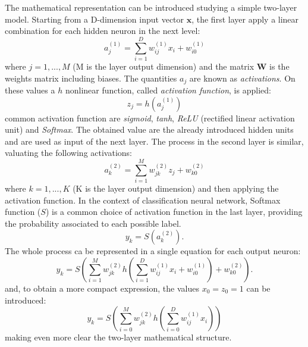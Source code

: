 The mathematical representation can be introduced studying a simple two-layer model. Starting from a D-dimension input vector $\bm{x}$, the first layer apply a linear combination for each hidden neuron in the next level:
\begin{equation}
    a_j^{(1)} = \sum_{i=1}^D w_{ij}^{(1)} x_i + w_{i0}^{(1)}
\end{equation}
where $j = 1,..., M$ (M is the layer output dimension) and the matrix $\bm{W}$ is the weights matrix including biases. The quantities $a_j$ are known as \textit{activations}. On these values a $h$ nonlinear function, called \textit{activation function}, is applied:
\begin{equation}
    z_j = h(a_j^{(1)})
\end{equation}
common activation function are \textit{sigmoid}, \textit{tanh}, \textit{ReLU} (rectified linear activation unit) and \textit{Softmax}. The obtained value are the already introduced hidden units and are used as input of the next layer. The process in the second layer is similar, valuating the following activations:
\begin{equation}
    a_k^{(2)} = \sum_{i=1}^M w_{jk}^{(2)} z_j + w_{k0}^{(2)}
\end{equation}
where $k = 1,..., K$ (K is the layer output dimension) and then applying the activation function. In the context of classification neural network, Softmax function ($S$) is a common choice of activation function in the last layer, providing the probability associated to each possible label.
\begin{equation}
    y_k = S(a_k^{(2)}).
\end{equation}
The whole process ca be represented in a single equation for each output neuron:
\begin{equation}
    y_k = S\left(\sum_{i=1}^M w_{jk}^{(2)} h\left(\sum_{i=1}^D w_{ij}^{(1)} x_i + w_{i0}^{(1)}\right) + w_{k0}^{(2)}\right).
\end{equation}
and, to obtain a more compact expression, the values $x_0=z_0=1$ can be introduced:
\begin{equation}
    y_k = S\left(\sum_{i=0}^M w_{jk}^{(2)} h\left(\sum_{i=0}^D w_{ij}^{(1)} x_i \right) \right)
\end{equation}
making even more clear the two-layer mathematical structure.\\

